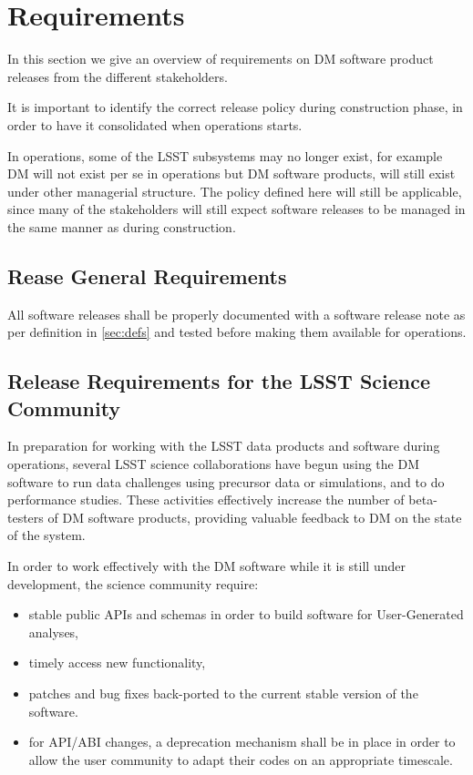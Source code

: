 \section{Requirements} \label{sec:reqs}

In this section we give an overview of requirements on \gls{DM} software product releases from the different stakeholders.

It is important to identify the correct release policy during construction phase, in order to have it consolidated when operations starts.

In operations, some of the \gls{LSST} subsystems may no longer exist, for example \gls{DM} will not exist per se in operations but \gls{DM} software products, will still exist under other managerial structure.
The policy defined here will still be applicable, since many of the stakeholders will still expect software releases to be managed in the same manner as during construction.


\subsection{Rease General Requirements} \label{sec:genreq}

All software releases shall be properly documented with a software release note as per definition in \ref{sec:defs} and tested before making them available for operations.


\subsection{Release Requirements for the \gls{LSST} Science Community} \label{sec:comreqs}

In preparation for working with the \gls{LSST} data products and software during operations, several \gls{LSST} science collaborations have begun using the \gls{DM} software to run data challenges using precursor data or simulations, and to do performance studies. These activities effectively increase the number of beta-testers of \gls{DM} software products, providing valuable feedback to \gls{DM} on the state of the system. 

In order to work effectively with the \gls{DM} software while it is still under development, the science community require: 
\begin{itemize}
\item stable public APIs and schemas in order to build software for User-Generated analyses, 
\item timely access new functionality,  
\item patches and bug fixes back-ported to the current stable version of the software. 
\item for API/ABI changes, a deprecation mechanism shall be in place in order to allow the user community to adapt their codes on an appropriate timescale.
\end{itemize}

